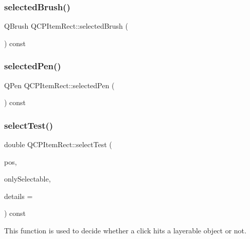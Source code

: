 \subsubsection{\texorpdfstring{selected\+Brush()}{selectedBrush()}}
{\footnotesize\ttfamily Q\+Brush Q\+C\+P\+Item\+Rect\+::selected\+Brush (\begin{DoxyParamCaption}{ }\end{DoxyParamCaption}) const\hspace{0.3cm}{\ttfamily [inline]}}

\mbox{\label{class_q_c_p_item_rect_abd93cf93404ce827dfae71d9d9d08b29}} 
\subsubsection{\texorpdfstring{selected\+Pen()}{selectedPen()}}
{\footnotesize\ttfamily Q\+Pen Q\+C\+P\+Item\+Rect\+::selected\+Pen (\begin{DoxyParamCaption}{ }\end{DoxyParamCaption}) const\hspace{0.3cm}{\ttfamily [inline]}}

\mbox{\label{class_q_c_p_item_rect_a2e68621b75bae4da6ae0ab2cdd0dd733}} 
\subsubsection{\texorpdfstring{select\+Test()}{selectTest()}}
{\footnotesize\ttfamily double Q\+C\+P\+Item\+Rect\+::select\+Test (\begin{DoxyParamCaption}\item[{const Q\+PointF \&}]{pos,  }\item[{bool}]{only\+Selectable,  }\item[{Q\+Variant $\ast$}]{details = {} }\end{DoxyParamCaption}) const\hspace{0.3cm}{\ttfamily [virtual]}}

This function is used to decide whether a click hits a layerable object or not.

